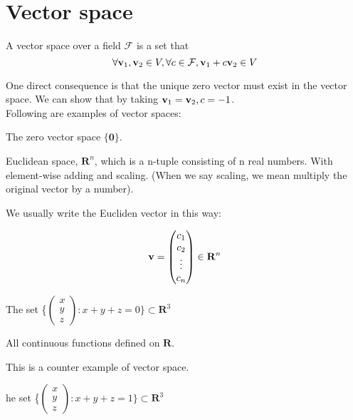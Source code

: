\section{Vector space}

\begin{definition}
    A vector space over a field $\mathcal{F}$ is a set that 
    $$\forall \mathbf{v}_1,\mathbf{v}_2 \in V, \forall c \in \mathcal{F}, \mathbf{v}_1+c\mathbf{v}_2 \in V$$
\end{definition}

One direct consequence is that the unique zero vector must exist in the vector space. We can show that by taking $\mathbf{v}_1 = \mathbf{v}_2, c = -1$.\\

Following are examples of vector spaces:
\begin{eg}
    The zero vector space $\{ \mathbf{0} \}$.
\end{eg}
\begin{eg}
    Euclidean space, $\mathbf{R}^n$, which is a n-tuple consisting of n real numbers. With element-wise adding and scaling. (When we say scaling, we mean multiply the original vector by a number).
\end{eg}

We usually write the Eucliden vector in this way:

$$\mathbf{v} = 
\begin{pmatrix}
    c_1\\
    c_2\\
    \vdots\\
    c_n
\end{pmatrix} \in \mathbf{R}^n$$

\begin{eg}
    The set \{$\begin{pmatrix}
        x\\
        y\\
        z
    \end{pmatrix}:x+y+z = 0\} \subset \mathbf{R}^3$
\end{eg}

\begin{eg}
    All continuous functions defined on $\mathbf{R}$.
\end{eg}
This is a counter example of vector space.
\begin{ceg}
    he set \{$\begin{pmatrix}
        x\\
        y\\
        z
    \end{pmatrix}:x+y+z = 1\} \subset \mathbf{R}^3$
\end{ceg}

